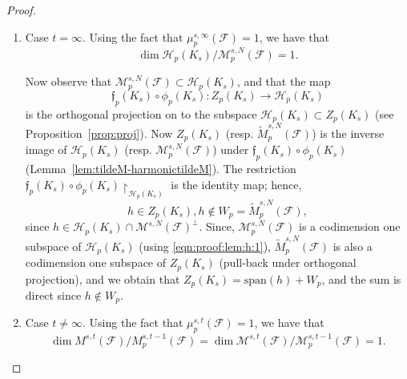 \documentclass[11pt]{amsart}
\theoremstyle{theorem}
\theoremstyle{remark}
\theoremstyle{definition}
\begin{document}
\begin{proof}
\begin{enumerate}
    \item Case $t=\infty$. 
    Using the fact that $\mu^{s,\infty}_p(\mathcal{F}) = 1$, we have that 
    \begin{equation}
    \label{eqn:proof:lem:h:1}
    \dim \mathcal{H}_p(K_s)/\mathcal{M}^{s,N}_p(\mathcal{F})=
    1.
    \end{equation}

     
    Now observe that
    $\mathcal{M}_p^{s,N}(\mathcal{F}) \subset  \mathcal{H}_p(K_s)$, and 
    that the map 
    \[
      \mathfrak{f}_p(K_s) \circ \phi_p(K_s): Z_p(K_s) \rightarrow \mathcal{H}_p(K_s)
    \]
    is the orthogonal projection on to the subspace 
    $\mathcal{H}_p(K_s) \subset Z_p(K_s)$ (see Proposition~\ref{prop:proj}).
    Now $Z_p(K_s)$ (resp. $\widetilde{M}^{s,N}_p(\mathcal{F})$) is the inverse image 
    of $\mathcal{H}_p(K_s)$ (resp. $\mathcal{M}^{s,N}_p(\mathcal{F})$) under $\mathfrak{f}_p(K_s) \circ \phi_p(K_s)$ (Lemma~\ref{lem:tildeM-harmonictildeM}). The restriction $\mathfrak{f}_p(K_s) \circ \phi_p(K_s)\restriction_{\mathcal{H}_p(K_s)}$ is the identity map; hence,
    \[
    h \in Z_p(K_s), h \not\in  W_p = \widetilde{M}^{s,N}_p(\mathcal{F}),
    \]
    since $h \in \mathcal{H}_p(K_s) \cap \mathcal{M}^{s,N}(\mathcal{F})^\perp$.
    Since,
    $\mathcal{M}^{s,N}_p(\mathcal{F})$ is a codimension one subspace of $\mathcal{H}_p(K_s)$ (using \eqref{eqn:proof:lem:h:1}),
    $\widetilde{M}^{s,N}_p(\mathcal{F})$ is also a codimension one subspace of $Z_p(K_s)$ (pull-back under orthogonal projection), and we obtain that
    $Z_p(K_s) = \mathrm{span}(h) + W_p$, and the sum is direct since $h \not\in W_p$.
    \item Case $t \neq \infty$. 
    Using the fact that $\mu^{s,t}_p(\mathcal{F}) = 1$, we have that 
    \begin{equation}
    \label{eqn:proof:lem:h:2}
    \dim M^{s,t}(\mathcal{F})/M^{s,t-1}_p(\mathcal{F}) = 
    \dim \mathcal{M}^{s,t}(\mathcal{F})/\mathcal{M}^{s,t-1}_p(\mathcal{F})=
    1.
    \end{equation}


\end{enumerate}
\end{proof}
\end{document}
